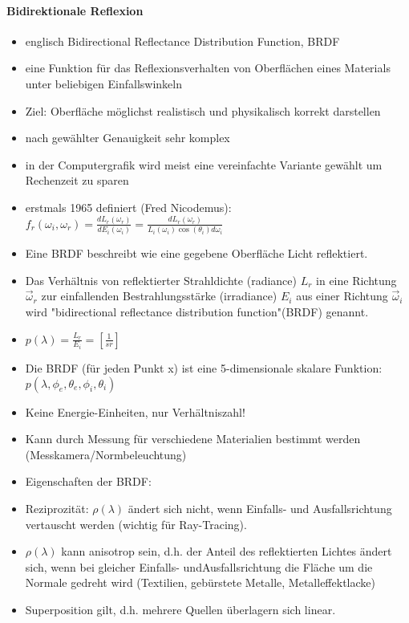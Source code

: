 \documentclass[10pt,landscape]{article}
\begin{document}
\begin{multicols}{3}
{  \paragraph{Bidirektionale Reflexion}
  \begin{itemize}
    \item englisch Bidirectional Reflectance Distribution Function, BRDF
    \item eine Funktion für das Reflexionsverhalten von Oberflächen eines Materials unter beliebigen Einfallswinkeln
    \item Ziel: Oberfläche möglichst realistisch und physikalisch korrekt darstellen
    \item nach gewählter Genauigkeit sehr komplex
    \item in der Computergrafik wird meist eine vereinfachte Variante gewählt um Rechenzeit zu sparen
    \item erstmals 1965 definiert (Fred Nicodemus): $f_r(\omega_i, \omega_r)=\frac{dL_r(\omega_r)}{dE_i(\omega_i)}=\frac{dL_r(\omega_r)}{L_i(\omega_i)\cos(\theta_i)d\omega_i}$
    \item Eine BRDF beschreibt wie eine gegebene Oberfläche Licht reflektiert.
    \item Das Verhältnis von reflektierter Strahldichte (radiance) $L_r$ in eine Richtung $\vec{ω}_r$ zur einfallenden Bestrahlungsstärke (irradiance) $E_i$ aus einer Richtung $\vec{ω}_i$ wird "bidirectional reflectance distribution function"(BRDF) genannt.
    \item $p(\lambda)=\frac{L_r}{E_i}=[\frac{1}{sr}]$
    \item Die BRDF (für jeden Punkt x) ist eine 5-dimensionale skalare Funktion: $p(\lambda, \phi_e, \theta_e, \phi_i, \theta_i)$
    \item Keine Energie-Einheiten, nur Verhältniszahl!
    \item Kann durch Messung für verschiedene Materialien bestimmt werden (Messkamera/Normbeleuchtung)
    \item Eigenschaften der BRDF:
    \item Reziprozität: $ρ(\lambda)$ ändert sich nicht, wenn Einfalls- und Ausfallsrichtung vertauscht werden (wichtig für Ray-Tracing).
    \item $ρ(\lambda)$ kann anisotrop sein, d.h. der Anteil des reflektierten Lichtes ändert sich, wenn bei gleicher Einfalls- undAusfallsrichtung die Fläche um die Normale gedreht wird (Textilien, gebürstete Metalle, Metalleffektlacke)
    \item Superposition gilt, d.h. mehrere Quellen überlagern sich linear.
  \end{itemize}
  
}
\end{multicols}
\end{document}
